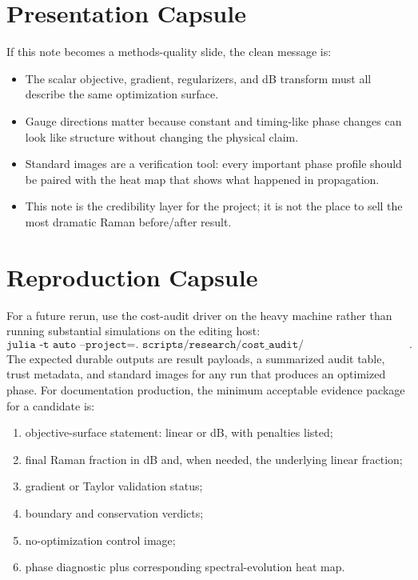 \documentclass[11pt]{article}
\begin{document}
\section{Presentation Capsule}

If this note becomes a methods-quality slide, the clean message is:
\begin{itemize}
    \item The scalar objective, gradient, regularizers, and dB transform must all describe the same optimization surface.
    \item Gauge directions matter because constant and timing-like phase changes can look like structure without changing the physical claim.
    \item Standard images are a verification tool: every important phase profile should be paired with the heat map that shows what happened in propagation.
    \item This note is the credibility layer for the project; it is not the place to sell the most dramatic Raman before/after result.
\end{itemize}

\section{Reproduction Capsule}

For a future rerun, use the cost-audit driver on the heavy machine rather than
running substantial simulations on the editing host:
\[
\texttt{julia -t auto --project=. scripts/research/cost\_audit/cost\_audit\_driver.jl}.
\]
The expected durable outputs are result payloads, a summarized audit table,
trust metadata, and standard images for any run that produces an optimized
phase. For documentation production, the minimum acceptable evidence package
for a candidate is:
\begin{enumerate}
    \item objective-surface statement: linear or dB, with penalties listed;
    \item final Raman fraction in dB and, when needed, the underlying linear
    fraction;
    \item gradient or Taylor validation status;
    \item boundary and conservation verdicts;
    \item no-optimization control image;
    \item phase diagnostic plus corresponding spectral-evolution heat map.
\end{enumerate}
\end{document}
